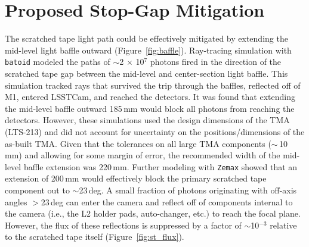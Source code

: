\documentclass[SE,lsstdraft,authoryear,toc]{lsstdoc}
\begin{document}

%
%

\section{Proposed Stop-Gap Mitigation}
\label{sec:mitigation}

The scratched tape light path could be effectively mitigated by extending the mid-level light baffle outward (Figure~\ref{fig:baffle}).
Ray-tracing simulation with \texttt{batoid} modeled the paths of ${\sim}$2 $\times$ 10$^7$ photons fired in the direction of the scratched tape gap between the mid-level and center-section light baffle. This simulation tracked rays that survived the trip through the baffles, reflected off of M1, entered LSSTCam, and reached the detectors. It was found that extending the mid-level baffle outward 185\,mm would block all photons from reaching the detectors. However, these simulations used the design dimensions of the TMA (LTS-213) and did not account for uncertainty on the positions/dimensions of the as-built TMA.
Given that the tolerances on all large TMA components ($\sim$\,10\,mm) and allowing for some margin of error, the recommended width of the mid-level baffle extension was 220\,mm. Further modeling with \texttt{Zemax} showed that an extension of 200\,mm would effectively block the primary scratched tape component out to $\sim$23\,deg. A small fraction of  photons originating with off-axis angles $>$23\,deg can enter the camera and reflect off of components internal to the camera (i.e., the L2 holder pads, auto-changer, etc.) to reach the focal plane. However, the flux of these reflections is suppressed by a factor of $\sim$10$^{-3}$ relative to the scratched tape itself (Figure~\ref{fig:st_flux}).
\end{document}
